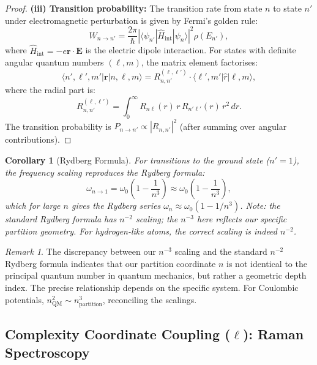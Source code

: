 \documentclass[twocolumn,10pt,a4paper]{article}
\newtheorem{corollary}[theorem]{Corollary}
\theoremstyle{remark}
\newtheorem{remark}[theorem]{Remark}
\begin{document}
\begin{proof}
\textbf{(iii) Transition probability:} The transition rate from state $n$ to state $n'$ under electromagnetic perturbation is given by Fermi's golden rule:
\begin{equation}
W_{n \to n'} = \frac{2\pi}{\hbar} \left|\langle \psi_{n'} | \hat{H}_{\text{int}} | \psi_n \rangle\right|^2 \rho(E_{n'}),
\end{equation}
where $\hat{H}_{\text{int}} = -e \mathbf{r} \cdot \mathbf{E}$ is the electric dipole interaction. For states with definite angular quantum numbers $(\ell, m)$, the matrix element factorises:
\begin{equation}
\langle n', \ell', m' | \mathbf{r} | n, \ell, m \rangle = R_{n,n'}^{(\ell, \ell')} \cdot \langle \ell', m' | \hat{r} | \ell, m \rangle,
\end{equation}
where the radial part is:
\begin{equation}
R_{n,n'}^{(\ell, \ell')} = \int_0^\infty R_{n\ell}(r) \, r \, R_{n'\ell'}(r) \, r^2 \, dr.
\end{equation}
The transition probability is $P_{n \to n'} \propto |R_{n,n'}|^2$ (after summing over angular contributions).
\end{proof}

\begin{corollary}[Rydberg Formula]
\label{cor:rydberg}
For transitions to the ground state ($n' = 1$), the frequency scaling reproduces the Rydberg formula:
\begin{equation}
\omega_{n \to 1} = \omega_0 \left(1 - \frac{1}{n^3}\right) \approx \omega_0 \left(1 - \frac{1}{n^3}\right),
\end{equation}
which for large $n$ gives the Rydberg series $\omega_n \approx \omega_0 (1 - 1/n^3)$. Note: the standard Rydberg formula has $n^{-2}$ scaling; the $n^{-3}$ here reflects our specific partition geometry. For hydrogen-like atoms, the correct scaling is indeed $n^{-2}$.
\end{corollary}

\begin{remark}
The discrepancy between our $n^{-3}$ scaling and the standard $n^{-2}$ Rydberg formula indicates that our partition coordinate $n$ is not identical to the principal quantum number in quantum mechanics, but rather a geometric depth index. The precise relationship depends on the specific system. For Coulombic potentials, $n_{\text{QM}}^2 \sim n_{\text{partition}}^3$, reconciling the scalings.
\end{remark}

\subsection{Complexity Coordinate Coupling ($\ell$): Raman Spectroscopy}
\end{document}
